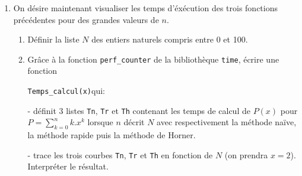 \begin{enumerate}
\begin{enumerate}
	\item Une dernière méthode consiste à utiliser le schéma de Hörner:
	\[P(x)= (\ldots((a_nx+a_{n-1})x+a_{n-2})x+...+a_1)x+a_0}\]

	\'Ecrire une fonction \texttt{horner(x,L)} de paramètres un réel $x$ et une liste $L$ représentant un polynôme $P$, renvoie la valeur de $P(x)$ par la méthode de Horner.

	\medskip Compter le nombre d'opérations au total pour calculer $P(x)$ et en donner un équivalent lorsque $n\to +\infty$.

	\end{enumerate}


	\item On désire maintenant visualiser les temps d'éxécution des trois fonctions précédentes pour des grandes valeurs de $n$.

	\begin{enumerate}\item Définir la liste $N$ des entiers naturels compris entre 0 et 100.

	\item Grâce à la fonction \texttt{perf\_counter} de la bibliothèque \texttt{time},  écrire une fonction 
	
	\texttt{Temps\_calcul(x)}qui:

	-  définit 3 listes \texttt{Tn}, \texttt{Tr} et \texttt{Th} contenant les temps de calcul de $P(x)$ pour $P=\displaystyle\sum_{k=0}^n k.x^k$ lorsque $n$ décrit $N$ avec respectivement la méthode naïve, la méthode rapide puis la méthode de Horner.

	- trace les trois courbes  \texttt{Tn}, \texttt{Tr} et \texttt{Th} en fonction de $N$ (on prendra $x=2$). Interpréter le résultat.

	\end{enumerate}

\end{enumerate}



















	
